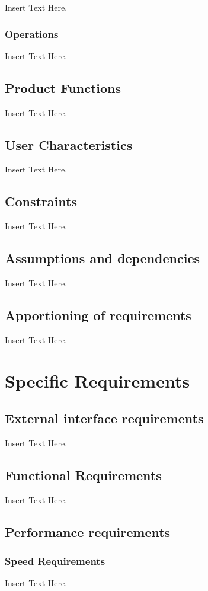 \documentclass [12pt]{article}
\begin{document}
Insert Text Here. 
\subsubsection{Operations}
Insert Text Here.

\subsection{Product Functions} 
Insert Text Here.

\subsection{User Characteristics}
Insert Text Here.

\subsection{Constraints}
Insert Text Here.

\subsection{Assumptions and dependencies} 
Insert Text Here.			

\subsection{Apportioning of requirements} 
Insert Text Here.


\section{Specific Requirements}
\subsection{External interface requirements}
Insert Text Here.

\subsection{Functional Requirements} 
Insert Text Here.
				
				
\subsection{Performance requirements} 
\subsubsection{Speed Requirements }
Insert Text Here.
\end{document}
